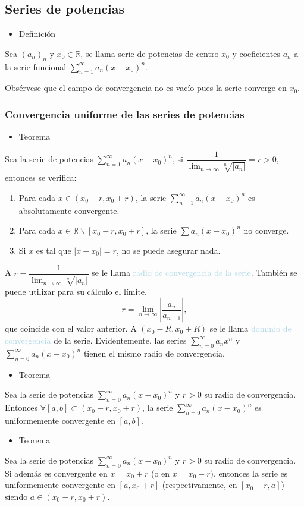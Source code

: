 \subsection{Series de potencias}
\begin{itemize}[label=\color{red}\textbullet, leftmargin=*]
	\item \color{lightblue}Definición
\end{itemize}
Sea $(a_n)_n$ y $x_0\in\mathbb{R}$, se llama serie de potencias de centro $x_0$ y coeficientes $a_n$ a la serie funcional $\sum_{n=1}^{\infty}a_n(x-x_0)^n$.

Obsérvese que el campo de convergencia no es vacío pues la serie converge en $x_0$.
\subsubsection{Convergencia uniforme de las series de potencias}
\begin{itemize}[label=\color{red}\textbullet, leftmargin=*]
	\item \color{lightblue}Teorema
\end{itemize}
Sea la serie de potencias $\sum_{n=1}^{\infty}a_n(x-x_0)^n$, si $\dfrac{1}{\lim_{n\to\infty}\sqrt[n]{|a_n|}}=r>0$, entonces se verifica: 
\begin{enumerate}[label=\arabic*)]
	\item Para cada $x\in(x_0-r,x_0+r)$, la serie $\sum_{n=1}^{\infty}a_n(x-x_0)^n$ es absolutamente convergente.
	\item Para cada $x\in\mathbb{R}\backslash\left[x_0-r,x_0+r\right]$, la serie $\sum a_n(x-x_0)^n$ no converge.
	\item Si $x$ es tal que $|x-x_0|=r$, no se puede asegurar nada.
\end{enumerate}
A $r=\dfrac{1}{\lim_{n\to\infty}\sqrt[n]{|a_n|}}$ se le llama \textcolor{lightblue}{radio de convergencia de la serie}. También se puede utilizar para su cálculo el límite. \[ r=\lim_{n\to\infty}\left|\dfrac{a_n}{a_{n+1}}\right|, \] que coincide con el valor anterior. A $(x_0-R,x_0+R)$ se le llama \textcolor{lightblue}{dominio de convergencia} de la serie. Evidentemente, las series $\sum_{n=0}^{\infty}a_nx^n$ y $\sum_{n=0}^{\infty}a_n(x-x_0)^n$ tienen el mismo radio de convergencia.
\begin{itemize}[label=\color{red}\textbullet, leftmargin=*]
	\item \color{lightblue}Teorema
\end{itemize}
Sea la serie de potencias $\sum_{n=0}^{\infty}a_n(x-x_0)^n$ y $r>0$ su radio de convergencia. Entonces $\forall[a,b]\subset(x_0-r,x_0+r)$, la serie $\sum_{n=0}^{\infty}a_n(x-x_0)^n$ es uniformemente convergente en $[a,b]$.
\begin{itemize}[label=\color{red}\textbullet, leftmargin=*]
	\item \color{lightblue}Teorema
\end{itemize}
Sea la serie de potencias $\sum_{n=0}^{\infty}a_n(x-x_0)^n$ y $r>0$ su radio de convergencia. Si además es convergente en $x=x_0+r$ (o en $x=x_0-r$), entonces la serie es uniformemente convergente en $[a,x_0+r]$ (respectivamente, en $[x_0-r,a]$) siendo $a\in(x_0-r,x_0+r)$.
